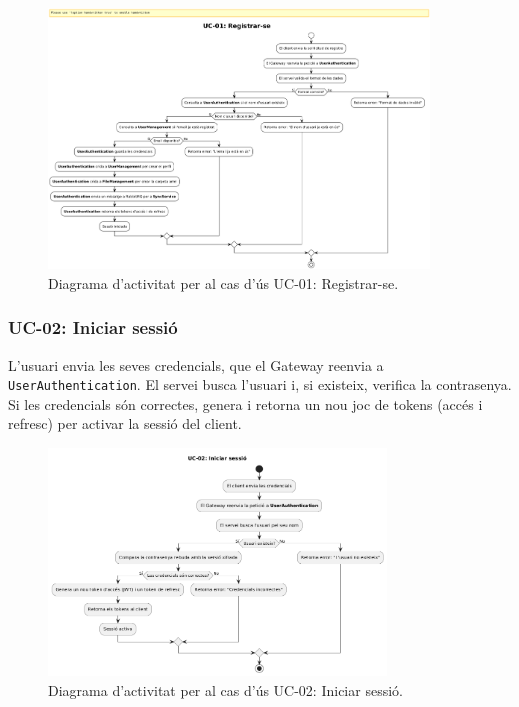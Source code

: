 \begin{figure}[H]
    \centering
    \includegraphics[width=0.9\textwidth]{Figures/ad_UC01.png}
    \caption{Diagrama d'activitat per al cas d'ús UC-01: Registrar-se.}
    \label{fig:ad_uc01}
\end{figure}

\subsubsection{UC-02: Iniciar sessió}
L'usuari envia les seves credencials, que el Gateway reenvia a \texttt{UserAuthentication}. El servei busca l'usuari i, si existeix, verifica la contrasenya. Si les credencials són correctes, genera i retorna un nou joc de tokens (accés i refresc) per activar la sessió del client.

\begin{figure}[H]
    \centering
    \includegraphics[width=0.8\textwidth]{Figures/ad_UC02.png}
    \caption{Diagrama d'activitat per al cas d'ús UC-02: Iniciar sessió.}
    \label{fig:ad_uc02}
\end{figure}

